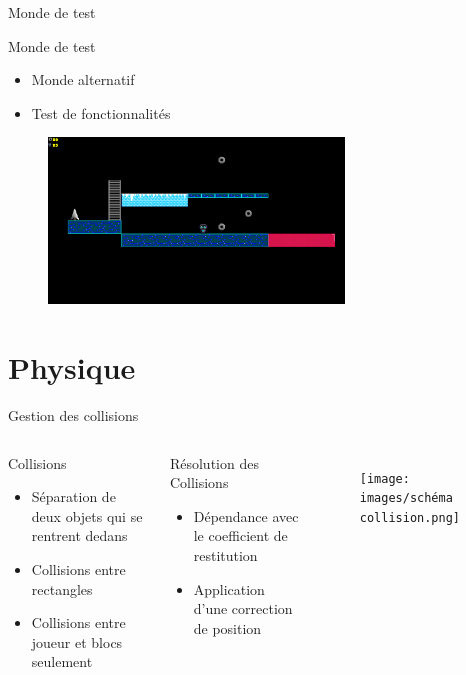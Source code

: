 \documentclass{beamer}
\begin{document}
{\begin{frame}{Monde de test}
    \begin{block}{Monde de test}
        \begin{itemize}
            \item[\bullet] Monde alternatif
            \item[\bullet] Test de fonctionnalités
        \end{itemize}
    \end{block}
    \begin{figure}
        \centering
        \includegraphics[width=0.7\textwidth]{test_world}
    \end{figure}
\end{frame}

\section{Physique}
\begin{frame}{Gestion des collisions}
    \begin{columns}
        \begin{block}{Collisions}
            \begin{itemize}
                \item[\bullet] Séparation de deux objets qui se rentrent dedans
                \item[\bullet] Collisions entre rectangles
                \item[\bullet] Collisions entre joueur et blocs seulement
            \end{itemize}
        \end{block}
        \begin{block}{Résolution des Collisions}
            \begin{itemize}
                \item[\bullet] Dépendance avec le coefficient de restitution
                \item[\bullet] Application d'une correction de position
            \end{itemize}
        \end{block}
        \begin{figure}
            \centering
            \texttt{[image: images/schéma collision.png]}
        \end{figure}
    \end{columns}
\end{frame}

}
\end{document}
